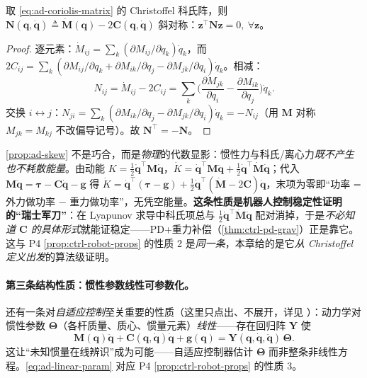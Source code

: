 \begin{proposition}
\label{prop:ad-skew}
取 \cref{eq:ad-coriolis-matrix} 的 Christoffel 科氏阵，则 $\mathbf{N}(\mathbf{q},\dot{\mathbf{q}})\triangleq\dot{\mathbf{M}}(\mathbf{q})-2\mathbf{C}(\mathbf{q},\dot{\mathbf{q}})$ 斜对称：$\mathbf{z}^\top\mathbf{N}\mathbf{z}=0,\ \forall\mathbf{z}$。
\end{proposition}
\begin{proof}
逐元素：$\dot{M}_{ij}=\sum_k(\partial M_{ij}/\partial q_k)\dot{q}_k$，而 $2C_{ij}=\sum_k(\partial M_{ij}/\partial q_k+\partial M_{ik}/\partial q_j-\partial M_{jk}/\partial q_i)\dot{q}_k$。相减：
\[
  N_{ij}=\dot{M}_{ij}-2C_{ij}=\sum_k\Big(\frac{\partial M_{jk}}{\partial q_i}-\frac{\partial M_{ik}}{\partial q_j}\Big)\dot{q}_k.
\]
交换 $i\leftrightarrow j$：$N_{ji}=\sum_k(\partial M_{ik}/\partial q_j-\partial M_{jk}/\partial q_i)\dot{q}_k=-N_{ij}$（用 $\mathbf{M}$ 对称 $M_{jk}=M_{kj}$ 不改偏导记号）。故 $\mathbf{N}^\top=-\mathbf{N}$。
\end{proof}

\begin{insight}
\label{ins:ad-passivity}
\cref{prop:ad-skew} 不是巧合，而是\emph{物理}的代数显影：惯性力与科氏/离心力\emph{既不产生也不耗散能量}。由动能 $K=\tfrac12\dot{\mathbf{q}}^\top\mathbf{M}\dot{\mathbf{q}}$，$\dot K=\dot{\mathbf{q}}^\top\mathbf{M}\ddot{\mathbf{q}}+\tfrac12\dot{\mathbf{q}}^\top\dot{\mathbf{M}}\dot{\mathbf{q}}$；代入 $\mathbf{M}\ddot{\mathbf{q}}=\boldsymbol{\tau}-\mathbf{C}\dot{\mathbf{q}}-\mathbf{g}$ 得 $\dot K=\dot{\mathbf{q}}^\top(\boldsymbol{\tau}-\mathbf{g})+\tfrac12\dot{\mathbf{q}}^\top(\dot{\mathbf{M}}-2\mathbf{C})\dot{\mathbf{q}}$，末项为零即“功率 = 外力做功率 − 重力做功率”，无凭空能量。\textbf{这条性质是机器人控制稳定性证明的“瑞士军刀”}：在 Lyapunov 求导中科氏项总与 $\tfrac12\dot{\mathbf{q}}^\top\dot{\mathbf{M}}\dot{\mathbf{q}}$ 配对消掉，于是\emph{不必知道 $\mathbf{C}$ 的具体形式}就能证稳定——PD+重力补偿（\cref{thm:ctrl-pd-grav}）正是靠它。这与 P4 \cref{prop:ctrl-robot-props} 的性质 2 是\emph{同一条}，本章给的是它\emph{从 Christoffel 定义出发}的算法级证明。
\end{insight}

\paragraph{第三条结构性质：惯性参数线性可参数化。}
还有一条对\emph{自适应控制}至关重要的性质（这里只点出、不展开，详见 \cite{spong2006robot}）：动力学对惯性参数 $\boldsymbol{\Theta}$（各杆质量、质心、惯量元素）\emph{线性}——存在回归阵 $\mathbf{Y}$ 使
\begin{equation}
  \mathbf{M}(\mathbf{q})\ddot{\mathbf{q}}+\mathbf{C}(\mathbf{q},\dot{\mathbf{q}})\dot{\mathbf{q}}+\mathbf{g}(\mathbf{q})=\mathbf{Y}(\mathbf{q},\dot{\mathbf{q}},\ddot{\mathbf{q}})\,\boldsymbol{\Theta}.
  \label{eq:ad-linear-param}
\end{equation}
这让“未知惯量在线辨识”成为可能——自适应控制器估计 $\boldsymbol{\Theta}$ 而非整条非线性方程。\cref{eq:ad-linear-param} 对应 P4 \cref{prop:ctrl-robot-props} 的性质 3。

